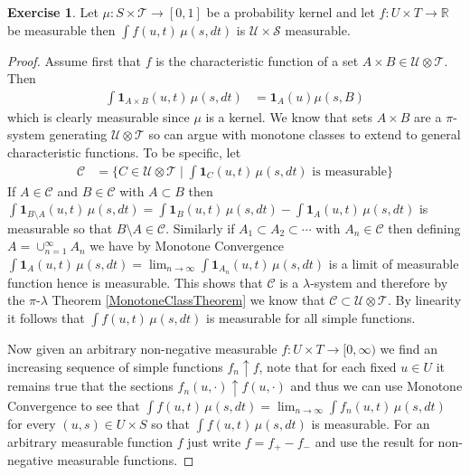\documentclass{amsbook}
\theoremstyle{definition}
\newtheorem{xca}{Exercise}
\theoremstyle{remark}
\newcommand{\characteristic}[1]{\textbf{1}_{#1}}
\newcommand{\reals}{\mathbb{R}}
\begin{document}
\begin{xca}\label{MeasurabilityKernelExtraParameter}Let $\mu : S \times \mathcal{T} \to [0,1]$ be a probability kernel and let $f : U \times T \to \reals$ be measurable then $\int f(u, t) \, \mu(s, dt)$ is $\mathcal{U} \times \mathcal{S}$ measurable.
\end{xca}
\begin{proof}
Assume first that $f$ is the characteristic function of a set $A \times B \in \mathcal{U} \otimes \mathcal{T}$.  Then 
\begin{align*}
\int \characteristic{ A\times B} (u, t) \, \mu(s, dt) &= \characteristic{A}(u) \mu(s, B)
\end{align*}
which is clearly measurable since $\mu$ is a kernel.  We know that sets $A \times B$ are a $\pi$-system generating $\mathcal{U} \otimes \mathcal{T}$ so can argue with monotone classes to extend to general characteristic functions.  To be specific, let 
\begin{align*}
\mathcal{C} &= \lbrace C \in \mathcal{U} \otimes \mathcal{T}  \mid \int \characteristic{C}(u,t) \, \mu(s,dt) \text{ is measurable} \rbrace
\end{align*}
If $A \in \mathcal{C}$ and $B \in \mathcal{C}$ with $A \subset B$ then 
$\int \characteristic{ B \setminus A} (u, t) \, \mu(s, dt) = \int \characteristic{ B } (u, t) \, \mu(s, dt) - \int \characteristic{A} (u, t) \, \mu(s, dt)$ is measurable so that $B \setminus A \in \mathcal{C}$.  Similarly if $A_1 \subset A_2 \subset \dotsb$ with $A_n \in \mathcal{C}$ then defining $A = \cup_{n=1}^\infty A_n$ we have by Monotone Convergence 
$\int \characteristic{A}(u,t) \, \mu(s, dt) = \lim_{n \to \infty} \int \characteristic{A_n}(u,t) \, \mu(s, dt)$ is a limit of measurable function hence is measurable.  This shows that $\mathcal{C}$ is a $\lambda$-system and therefore by the $\pi$-$\lambda$ Theorem \ref{MonotoneClassTheorem} we know that $\mathcal{C} \subset \mathcal{U}\otimes \mathcal{T}$.  By linearity it follows that $\int f(u,t) \, \mu(s, dt)$ is measurable for all simple functions.

Now given an arbitrary non-negative measurable $f : U \times T \to [0,\infty)$ we find an increasing sequence of simple functions $f_n \uparrow f$, note that for each fixed $u \in U$ it remains true that the sections $f_n(u, \cdot) \uparrow f(u, \cdot)$ and thus we can use Monotone Convergence to see that $\int f(u,t) \, \mu(s,dt) = \lim_{n \to \infty} \int f_n(u,t) \, \mu(s,dt)$ for every $(u,s) \in U \times S$ so that $\int f(u,t) \, \mu(s,dt)$ is measurable.  For an arbitrary measurable function $f$ just write $f = f_+ - f_-$ and use the result for non-negative measurable functions.
\end{proof}
\end{document}
